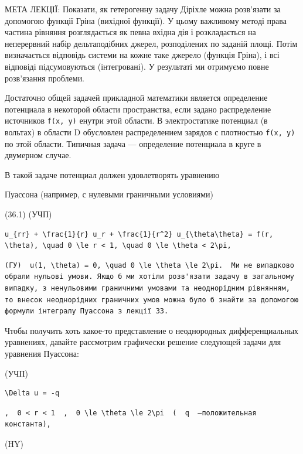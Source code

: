 \documentclass[
  ukrainian,
]{article}
\begin{document}
МЕТА ЛЕКЦІЇ: Показати, як гетерогенну задачу Діріхле можна розв'язати за
допомогою функції Гріна (вихідної функції). У цьому важливому методі
права частина рівняння розглядається як певна вхідна дія і розкладається
на неперервний набір дельтаподібних джерел, розподілених по заданій
площі. Потім визначається відповідь системи на кожне таке джерело
(функція Гріна), і всі відповіді підсумовуються (інтегровані). У
результаті ми отримуємо повне розв'язання проблеми.

Достаточно общей задачей прикладной математики является определение
потенциала в некоторой области пространства, если задано распределение
источников \texttt{f(x,\ y)} енутри этой области. В электростатике
потенциал (в вольтах) в области D обусловлен распределением зарядов с
плотностью \texttt{f(x,\ y)} по этой области. Типичная задача ---
определение потенциала в круге в двумерном случае.

В такой задаче потенциал должен удовлетворять уравнению

Пуассона (например, с нулевыми граничными условиями)

(36.1) (УЧП)

\begin{verbatim}
u_{rr} + \frac{1}{r} u_r + \frac{1}{r^2} u_{\theta\theta} = f(r, \theta), \quad 0 \le r < 1, \quad 0 \le \theta < 2\pi,
\end{verbatim}

\begin{verbatim}
(ГУ)  u(1, \theta) = 0, \quad 0 \le \theta \le 2\pi.  Ми не випадково обрали нульові умови. Якщо б ми хотіли розв'язати задачу в загальному випадку, з ненульовими граничними умовами та неоднорідним рівнянням, то внесок неоднорідних граничних умов можна було б знайти за допомогою формули інтегралу Пуассона з лекції 33.
\end{verbatim}

Чтобы получить хоть какое-то представление о неоднородных
дифференциальных уравнениях, давайте рассмотрим графически решение
следующей задачи для уравнения Пуассона:

(УЧП)

\begin{verbatim}
\Delta u = -q
\end{verbatim}

\begin{verbatim}
,  0 < r < 1  ,  0 \le \theta \le 2\pi  (  q  —положительная константа),
\end{verbatim}

(HY)
\end{document}
